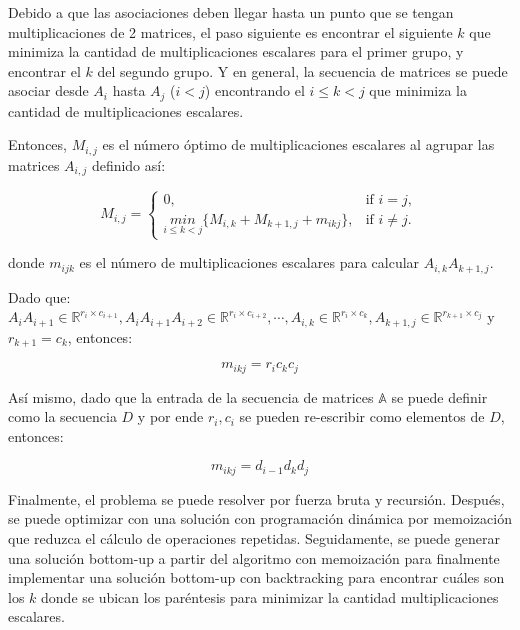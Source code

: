 \documentclass[letter]{article}
\begin{document}
Debido a que las asociaciones deben llegar hasta un punto que se tengan multiplicaciones de 2 matrices, el paso siguiente es encontrar el siguiente $k$ que minimiza la cantidad de multiplicaciones escalares para el primer grupo, y encontrar el $k$ del segundo grupo. Y en general, la secuencia de matrices se puede asociar desde $A_i$ hasta $A_j$ ($i < j$) encontrando el $i \leq k < j$ que minimiza la cantidad de multiplicaciones escalares. \par

Entonces, $M_{i,j}$ es el número óptimo de multiplicaciones escalares al agrupar las matrices $A_{i,j}$ definido así: \par

\[ M_{i,j} = 
    \begin{cases} 
        0, & \text{if } i = j, \\
        \underset{i \leq k < j}{min} \{ M_{i,k} + M_{k+1,j} + m_{ikj} \}, & \text{if } i \neq j.
    \end{cases} \]

donde $m_{ijk}$ es el número de multiplicaciones escalares para calcular $A_{i,k} A_{k+1,j}$. \par

Dado que: $A_i A_{i+1} \in \mathbb{R}^{r_i \times c_{i+1}}, A_i A_{i+1} A_{i+2} \in \mathbb{R}^{r_i \times c_{i+2}}, \cdots, A_{i,k} \in \mathbb{R}^{r_i \times c_k}, A_{k+1,j} \in \mathbb{R}^{r_{k+1} \times c_j}$ y $r_{k+1} = c_k$, entonces: \par

\[ m_{ikj} = r_i c_k c_j \]

Así mismo, dado que la entrada de la secuencia de matrices $\mathbb{A}$ se puede definir como la secuencia $D$ y por ende $r_i, c_i$ se pueden re-escribir como elementos de $D$, entonces: \par

\[ m_{ikj} = d_{i-1} d_k d_j \]

Finalmente, el problema se puede resolver por fuerza bruta y recursión. Después, se puede optimizar con una solución con programación dinámica por memoización que reduzca el cálculo de operaciones repetidas. Seguidamente, se puede generar una solución bottom-up a partir del algoritmo con memoización para finalmente implementar una solución bottom-up con backtracking para encontrar cuáles son los $k$ donde se ubican los paréntesis para minimizar la cantidad multiplicaciones escalares. \par

\newpage
\end{document}
